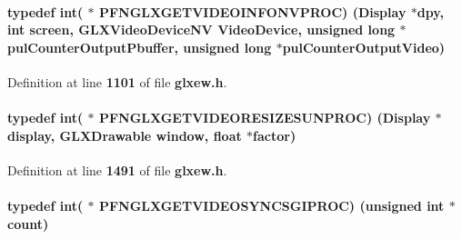 \paragraph[{P\+F\+N\+G\+L\+X\+G\+E\+T\+V\+I\+D\+E\+O\+I\+N\+F\+O\+N\+V\+P\+R\+OC}]{\setlength{\rightskip}{0pt plus 5cm}typedef {\bf int}( $\ast$  P\+F\+N\+G\+L\+X\+G\+E\+T\+V\+I\+D\+E\+O\+I\+N\+F\+O\+N\+V\+P\+R\+OC) (Display $\ast$dpy, {\bf int} screen, {\bf G\+L\+X\+Video\+Device\+NV} Video\+Device, unsigned long $\ast${\bf pul\+Counter\+Output\+Pbuffer}, unsigned long $\ast${\bf pul\+Counter\+Output\+Video})}\label{glxew_8h_a7fac75306eb0b21c129eedafd422614a}


Definition at line {\bf 1101} of file {\bf glxew.\+h}.

\paragraph[{P\+F\+N\+G\+L\+X\+G\+E\+T\+V\+I\+D\+E\+O\+R\+E\+S\+I\+Z\+E\+S\+U\+N\+P\+R\+OC}]{\setlength{\rightskip}{0pt plus 5cm}typedef {\bf int}( $\ast$  P\+F\+N\+G\+L\+X\+G\+E\+T\+V\+I\+D\+E\+O\+R\+E\+S\+I\+Z\+E\+S\+U\+N\+P\+R\+OC) (Display $\ast$display, {\bf G\+L\+X\+Drawable} window, float $\ast$factor)}\label{glxew_8h_a3a4ba91620e1c15b687ca8faa3302340}


Definition at line {\bf 1491} of file {\bf glxew.\+h}.

\paragraph[{P\+F\+N\+G\+L\+X\+G\+E\+T\+V\+I\+D\+E\+O\+S\+Y\+N\+C\+S\+G\+I\+P\+R\+OC}]{\setlength{\rightskip}{0pt plus 5cm}typedef {\bf int}( $\ast$  P\+F\+N\+G\+L\+X\+G\+E\+T\+V\+I\+D\+E\+O\+S\+Y\+N\+C\+S\+G\+I\+P\+R\+OC) (unsigned {\bf int} $\ast${\bf count})}\label{glxew_8h_a89606120cd98bcbf4018569354f28fe7}


